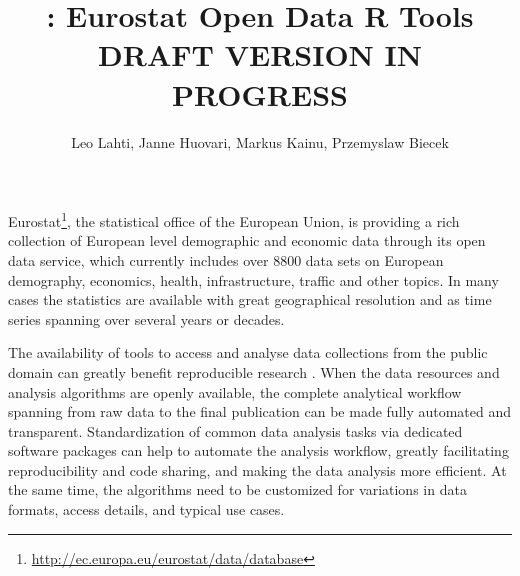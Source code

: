 \title{: Eurostat Open Data R Tools\\DRAFT VERSION IN PROGRESS}
\author{Leo Lahti, Janne Huovari, Markus Kainu, Przemyslaw Biecek}

\maketitle


Eurostat\footnote{\url{http://ec.europa.eu/eurostat/data/database}},
the statistical office of the European Union, is providing a rich
collection of European level demographic and economic data through its
open data service, which currently includes over 8800 data sets on
European demography, economics, health, infrastructure, traffic and
other topics. In many cases the statistics are available with great
geographical resolution and as time series spanning over several years
or decades.

The availability of tools to access and analyse data collections from
the public domain can greatly benefit reproducible
research \citep{Gandrud13, Boettiger2015}. When the data resources and
analysis algorithms are openly available, the complete analytical
workflow spanning from raw data to the final publication can be made
fully automated and transparent. Standardization of common data
analysis tasks via dedicated software packages can help to automate
the analysis workflow, greatly facilitating reproducibility and code
sharing, and making the data analysis more efficient. At the same
time, the algorithms need to be customized for variations in data
formats, access details, and typical use cases.

